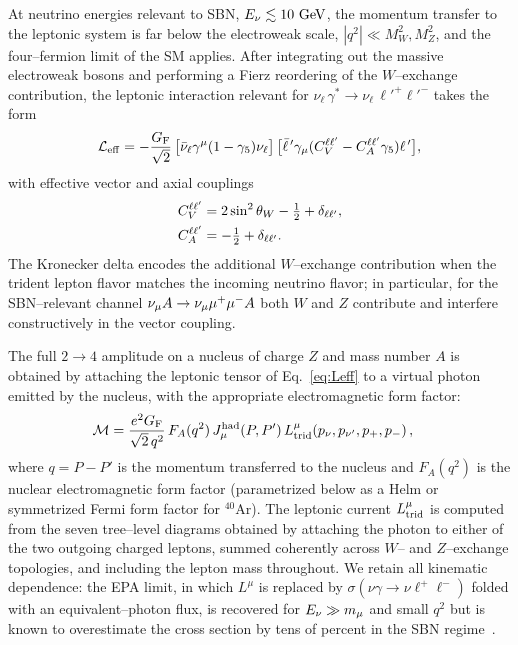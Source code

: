 At neutrino energies relevant to SBN, $E_\nu \lesssim 10~\text{GeV}$, the
momentum transfer to the leptonic system is far below the electroweak
scale, $|q^2|\ll M_W^2, M_Z^2$, and the four--fermion limit of the SM
applies.  After integrating out the massive electroweak bosons and
performing a Fierz reordering of the $W$--exchange contribution,
the leptonic interaction relevant for
$\nu_\ell\, \gamma^* \to \nu_\ell\, \ell'^+ \ell'^-$ takes the form
\begin{equation}
  \mathcal{L}_{\rm eff} =
  -\frac{G_{\rm F}}{\sqrt{2}}\,
  \big[\bar\nu_\ell \gamma^\mu (1-\gamma_5) \nu_\ell\big]\,
  \big[\bar\ell^{\,\prime}\gamma_\mu (C_V^{\ell\ell'} - C_A^{\ell\ell'}\gamma_5)
       \ell^{\,\prime}\big],
  \label{eq:Leff}
\end{equation}
with effective vector and axial couplings
\begin{align}
  C_V^{\ell\ell'} &= 2\sin^2\theta_W - \tfrac{1}{2} + \delta_{\ell\ell'},\\
  C_A^{\ell\ell'} &= -\tfrac{1}{2} + \delta_{\ell\ell'}.
\end{align}
The Kronecker delta encodes the additional $W$--exchange contribution
when the trident lepton flavor matches the incoming neutrino flavor;
in particular, for the SBN--relevant channel $\nu_\mu A \to \nu_\mu \mu^+
\mu^- A$ both $W$ and $Z$ contribute and interfere constructively in
the vector coupling.

The full $2\to 4$ amplitude on a nucleus of charge $Z$ and mass
number $A$ is obtained by attaching the leptonic tensor of
Eq.~\eqref{eq:Leff} to a virtual photon emitted by the nucleus, with
the appropriate electromagnetic form factor:
\begin{align}
  \mathcal{M} =\;& \frac{e^2 G_{\rm F}}{\sqrt{2}\,q^2}\,
    F_A(q^2)\,J_\mu^{\rm had}(P,P')\,
    L^{\mu}_{\rm trid}(p_\nu,p_{\nu'},p_+,p_-)\,,
  \label{eq:M-coh}
\end{align}
where $q = P-P'$ is the momentum transferred to the nucleus and
$F_A(q^2)$ is the nuclear electromagnetic form factor (parametrized
below as a Helm or symmetrized Fermi form factor for ${}^{40}\text{Ar}$).
The leptonic current $L^\mu_{\rm trid}$ is computed from the seven
tree--level diagrams obtained by attaching the photon to either of the
two outgoing charged leptons, summed coherently across $W$-- and
$Z$--exchange topologies, and including the lepton mass throughout.
We retain all kinematic dependence: the EPA limit, in which $L^\mu$ is
replaced by $\sigma(\nu \gamma \to \nu \ell^+ \ell^-)$ folded with an
equivalent--photon flux, is recovered for $E_\nu \gg m_\mu$ and small
$q^2$ but is known to overestimate the cross section by tens of percent
in the SBN regime~\cite{Ballett:2018uuc,Zhou:2019vxt}.

